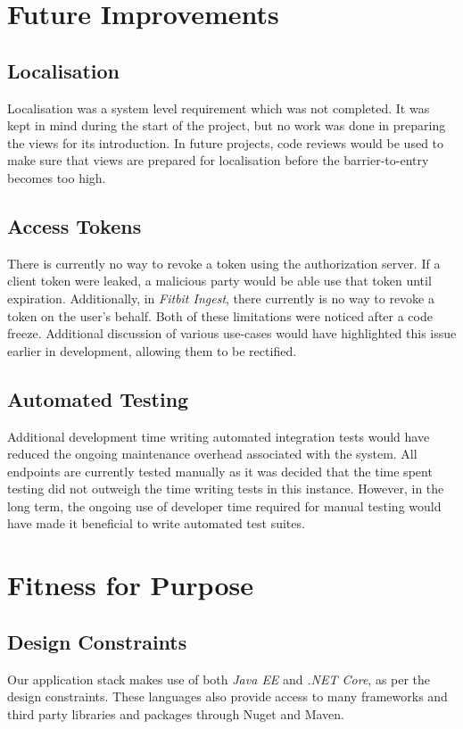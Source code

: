 \section{Future Improvements}

  \subsection{Localisation}
  \par
  Localisation was a system level requirement which was not completed. It was kept in mind during the start of the project, but no work was done in preparing the views for its introduction. In future projects, code reviews would be used to make sure that views are prepared for localisation before the barrier-to-entry becomes too high.

  \subsection{Access Tokens}
  There is currently no way to revoke a token using the authorization server. If a client token were leaked, a malicious party would be able use that token until expiration. Additionally, in \textit{Fitbit Ingest}, there currently is no way to revoke a token on the user's behalf. Both of these limitations were noticed after a code freeze. Additional discussion of various use-cases would have highlighted this issue earlier in development, allowing them to be rectified.

  \subsection{Automated Testing}
  \par
  Additional development time writing automated integration tests would have reduced the ongoing maintenance overhead associated with the system. All endpoints are currently tested manually as it was decided that the time spent testing did not outweigh the time writing tests in this instance. However, in the long term, the ongoing use of developer time required for manual testing would have made it beneficial to write automated test suites.

\section{Fitness for Purpose}
  \subsection{Design Constraints}
  \par
  Our application stack makes use of both \textit{Java EE} and \textit{.NET Core}, as per the design constraints. These languages also provide access to many frameworks and third party libraries and packages through Nuget and Maven.

